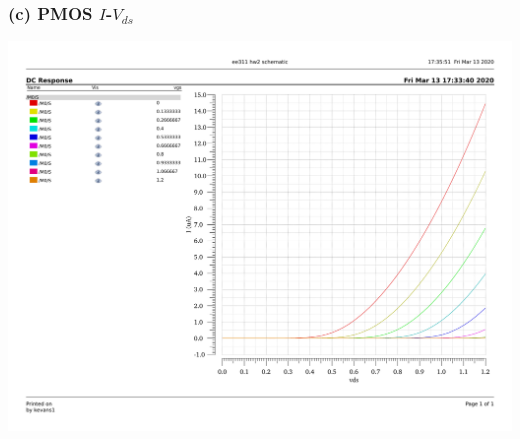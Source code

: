 \documentclass{homework}
\begin{document}
	\pagebreak
	\subsubsection*{(c) PMOS $I$-$V_{ds}$}			
	\includegraphics[width=1\linewidth]{pmos}

	\pagebreak
\end{document}
